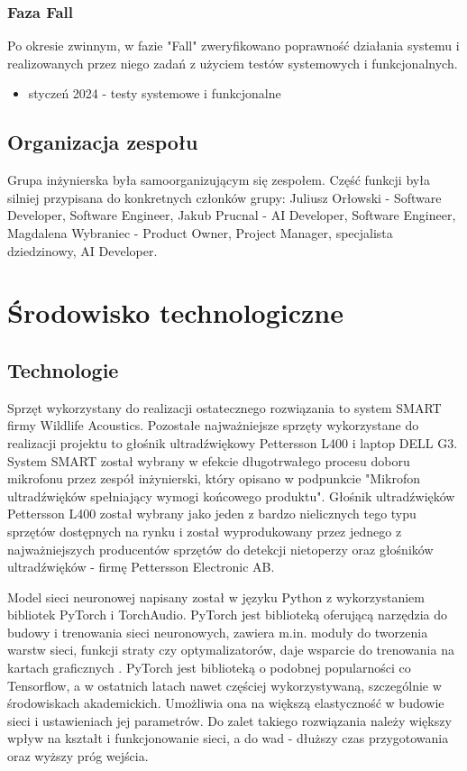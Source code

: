 \documentclass{sprz}
\begin{document}
\subsubsection{Faza Fall}
Po okresie zwinnym, w fazie "Fall" zweryfikowano poprawność działania systemu i realizowanych przez niego zadań z użyciem testów systemowych i funkcjonalnych.
\begin{itemize}
  \item{styczeń 2024 - testy systemowe i funkcjonalne}
  \end{itemize}


\subsection{Organizacja zespołu}
Grupa inżynierska była samoorganizującym się zespołem. Część funkcji była silniej przypisana do konkretnych członków grupy:
Juliusz Orłowski - Software Developer, Software Engineer, Jakub Prucnal - AI Developer, Software Engineer, Magdalena Wybraniec - Product Owner, Project Manager, specjalista dziedzinowy, AI Developer. 



\section{Środowisko technologiczne}

\subsection{Technologie}
Sprzęt wykorzystany do realizacji ostatecznego rozwiązania to system SMART firmy Wildlife Acoustics. Pozostałe najważniejsze sprzęty wykorzystane do realizacji projektu to głośnik ultradźwiękowy Pettersson L400 i laptop DELL G3. System SMART został wybrany w efekcie długotrwałego procesu doboru mikrofonu przez zespół inżynierski, który opisano w podpunkcie "Mikrofon ultradźwięków spełniający wymogi końcowego produktu". Głośnik ultradźwięków Pettersson L400 został wybrany jako jeden z bardzo nielicznych tego typu sprzętów dostępnych na rynku i został wyprodukowany przez jednego z najważniejszych producentów sprzętów do detekcji nietoperzy oraz głośników ultradźwięków - firmę Pettersson Electronic AB.

Model sieci neuronowej napisany został w języku Python z wykorzystaniem bibliotek PyTorch i TorchAudio.
PyTorch jest biblioteką oferującą narzędzia do budowy i trenowania sieci neuronowych, zawiera m.in. moduły do tworzenia warstw sieci, funkcji straty czy optymalizatorów, daje wsparcie do trenowania na kartach graficznych \cite{pytorch}.
PyTorch jest biblioteką o podobnej popularności co Tensorflow, a w ostatnich latach nawet częściej wykorzystywaną, szczególnie w środowiskach akademickich. Umożliwia ona na większą elastyczność w budowie sieci i ustawieniach jej parametrów. Do zalet takiego rozwiązania należy większy wpływ na kształt i funkcjonowanie sieci, a do wad - dłuższy czas przygotowania oraz wyższy próg wejścia. 
\end{document}
